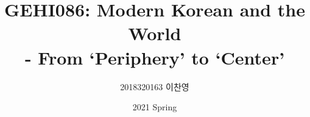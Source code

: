 

\title{GEHI086: Modern Korean and the World\\ - From `Periphery' to `Center'}
\author{2018320163 이찬영}
\date{2021 Spring}


    \maketitle
    \tableofcontents
    \setimgdir

